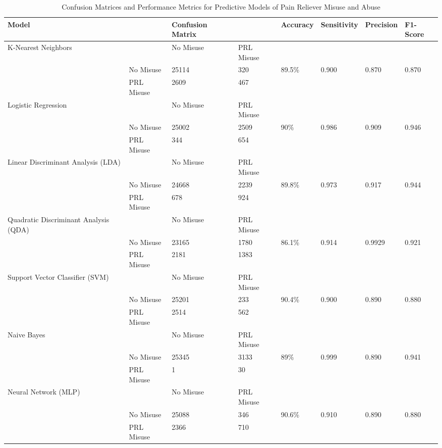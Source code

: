\documentclass[sigconf]{acmart}
\begin{document}
\begin{table*}[ht]
  \caption{Confusion Matrices and Performance Metrics for Predictive Models of 
  Pain Reliever Misuse and Abuse}
  \label{tab:freq}
  \begin{tabular}{llllllll}
    \toprule
    Model& & Confusion Matrix & & Accuracy & Sensitivity & Precision & F1-Score \\
    \midrule
    K-Nearest Neighbors & & No Misuse & PRL Misuse &  &  &  & \\
     & No Misuse & 25114 & 320 & 89.5\% & 0.900 & 0.870 & 0.870 \\
     & PRL Misuse & 2609 & 467 &  &  &  & \\
    \midrule
    Logistic Regression & & No Misuse & PRL Misuse &  &  &  & \\
     & No Misuse & 25002 & 2509 & 90\% & 0.986 & 0.909 & 0.946 \\
     & PRL Misuse & 344 & 654 &  &  &  & \\
    \midrule
    Linear Discriminant Analysis (LDA) & & No Misuse & PRL Misuse &  &  &  & \\
     & No Misuse & 24668 & 2239 & 89.8\% & 0.973 & 0.917 & 0.944 \\
     & PRL Misuse & 678 & 924 &  &  &  & \\
    \midrule
    Quadratic Discriminant Analysis (QDA) & & No Misuse & PRL Misuse &  &  &  & \\
     & No Misuse & 23165 & 1780 & 86.1\% & 0.914 & 0.9929 & 0.921 \\
     & PRL Misuse & 2181 & 1383 &  &  &  & \\
    \midrule
    Support Vector Classifier (SVM) & & No Misuse & PRL Misuse &  &  &  & \\
     & No Misuse & 25201 & 233 & 90.4\% & 0.900 & 0.890 & 0.880 \\
     & PRL Misuse & 2514 & 562 &  &  &  & \\
    \midrule
    Naive Bayes & & No Misuse & PRL Misuse &  &  &  & \\
     & No Misuse & 25345 & 3133 & 89\% & 0.999 & 0.890 & 0.941 \\
     & PRL Misuse & 1 & 30 &  &  &  & \\
    \midrule
    Neural Network (MLP) & & No Misuse & PRL Misuse &  &  &  & \\
     & No Misuse & 25088 & 346 & 90.6\% & 0.910 & 0.890 & 0.880 \\
     & PRL Misuse & 2366 & 710 &  &  &  & \\

\end{tabular}
\end{table*}
\end{document}
